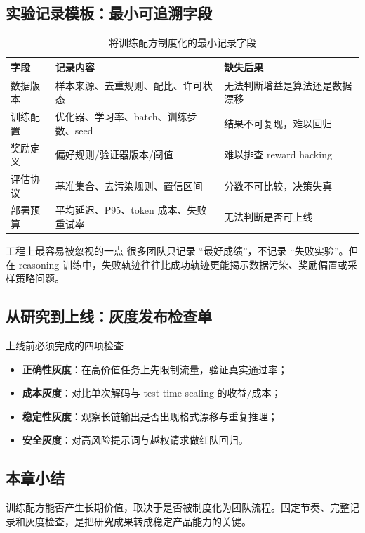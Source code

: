 \documentclass[a4paper]{article}
\begin{document}
\subsection{实验记录模板：最小可追溯字段}
\begin{table}[H]
\centering
\renewcommand{\arraystretch}{1.2}
\begin{tabular}{p{3.0cm}p{3.7cm}p{4.1cm}}
\toprule
\textbf{字段} & \textbf{记录内容} & \textbf{缺失后果} \\
\midrule
数据版本 & 样本来源、去重规则、配比、许可状态 & 无法判断增益是算法还是数据漂移 \\
训练配置 & 优化器、学习率、batch、训练步数、seed & 结果不可复现，难以回归 \\
奖励定义 & 偏好规则/验证器版本/阈值 & 难以排查 reward hacking \\
评估协议 & 基准集合、去污染规则、置信区间 & 分数不可比较，决策失真 \\
部署预算 & 平均延迟、P95、token 成本、失败重试率 & 无法判断是否可上线 \\
\bottomrule
\end{tabular}
\caption{将训练配方制度化的最小记录字段}
\end{table}

\begin{knowledgebox}{工程上最容易被忽视的一点}
很多团队只记录 ``最好成绩''，不记录 ``失败实验''。但在 reasoning 训练中，失败轨迹往往比成功轨迹更能揭示数据污染、奖励偏置或采样策略问题。
\end{knowledgebox}

\subsection{从研究到上线：灰度发布检查单}
\begin{warningbox}{上线前必须完成的四项检查}
\begin{itemize}
    \item \textbf{正确性灰度}：在高价值任务上先限制流量，验证真实通过率；
    \item \textbf{成本灰度}：对比单次解码与 test-time scaling 的收益/成本；
    \item \textbf{稳定性灰度}：观察长链输出是否出现格式漂移与重复推理；
    \item \textbf{安全灰度}：对高风险提示词与越权请求做红队回归。
\end{itemize}
\end{warningbox}

\subsection{本章小结}
训练配方能否产生长期价值，取决于是否被制度化为团队流程。固定节奏、完整记录和灰度检查，是把研究成果转成稳定产品能力的关键。
\end{document}
